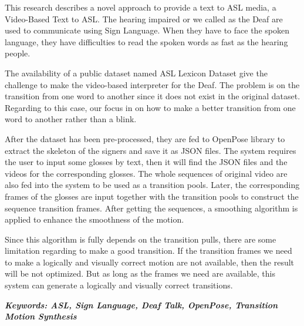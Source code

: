 This research describes a novel approach to provide a text to ASL media, a Video-Based Text to ASL. The hearing impaired or we called as the Deaf are used to communicate using Sign Language. When they have to face the spoken language, they have difficulties to read the spoken words as fast as the hearing people.

The availability of a public dataset named ASL Lexicon Dataset give the challenge to make the video-based interpreter for the Deaf. The problem is on the transition from one word to another since it does not exist in the original dataset. Regarding to this case, our focus in on how to make a better transition from one word to another rather than a blink. 

After the dataset has been pre-processed, they are fed to OpenPose library to extract the skeleton of the signers and save it as JSON files. The system requires the user to input some glosses by text, then it will find the JSON files and the videos for the corresponding glosses. The whole sequences of original video are also fed into the system to be used as a transition pools. Later, the corresponding frames of the glosses are input together with the transition pools to construct the sequence transition frames. After getting the sequences, a smoothing algorithm is applied to enhance the smoothness of the motion. 

Since this algorithm is fully depends on the transition pulls, there are some limitation regarding to make a good transition. If the transition frames we need to make a logically and visually correct motion are not available, then the result will be not optimized. But as long as the frames we need are available, this system can generate a logically and visually correct transitions.

\textit{\textbf{Keywords: ASL, Sign Language, Deaf Talk, OpenPose, Transition Motion Synthesis}} 